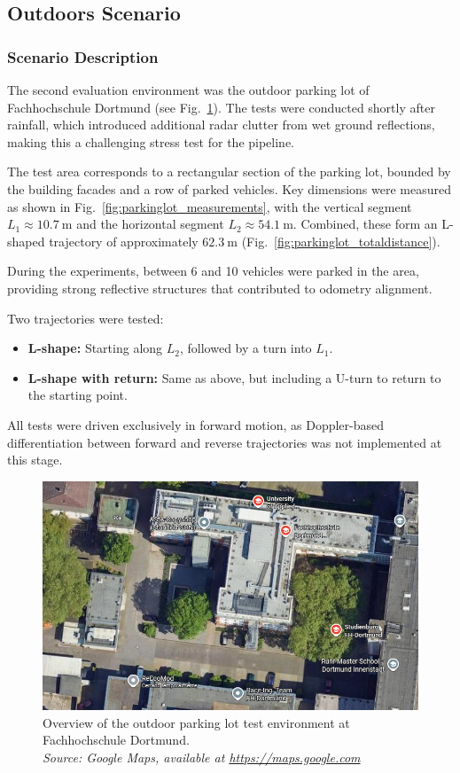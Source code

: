 \subsection{Outdoors Scenario}
\subsubsection{Scenario Description}
The second evaluation environment was the outdoor parking lot of Fachhochschule Dortmund (see Fig.~\ref{fig:parking_lot_overview}).  
The tests were conducted shortly after rainfall, which introduced additional radar clutter from wet ground reflections, making this a challenging stress test for the pipeline.  

The test area corresponds to a rectangular section of the parking lot, bounded by the building facades and a row of parked vehicles.  
Key dimensions were measured as shown in Fig.~\ref{fig:parkinglot_measurements}, with the vertical segment $L_1 \approx \SI{10.7}{\meter}$ and the horizontal segment $L_2 \approx \SI{54.1}{\meter}$.  
Combined, these form an L-shaped trajectory of approximately $\SI{62.3}{\meter}$ (Fig.~\ref{fig:parkinglot_totaldistance}).  

During the experiments, between 6 and 10 vehicles were parked in the area, providing strong reflective structures that contributed to odometry alignment.  

Two trajectories were tested:
\begin{itemize}
    \item \textbf{L-shape:} Starting along $L_2$, followed by a turn into $L_1$.
    \item \textbf{L-shape with return:} Same as above, but including a U-turn to return to the starting point.
\end{itemize}

All tests were driven exclusively in forward motion, as Doppler-based differentiation between forward and reverse trajectories was not implemented at this stage.

\begin{figure}[!htbp]
    \centering
    \includegraphics[width=0.9\linewidth]{images/FH_ParkingLot.png}
    \caption{Overview of the outdoor parking lot test environment at Fachhochschule Dortmund.\\
    \textit{Source: Google Maps, available at \url{https://maps.google.com} \cite{googlemaps_fhdo}}}
    \label{fig:parking_lot_overview}
\end{figure}

